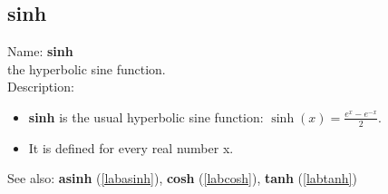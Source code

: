 \subsection{sinh}
\label{labsinh}
\noindent Name: \textbf{sinh}\\
the hyperbolic sine function.\\
\noindent Description: \begin{itemize}

\item \textbf{sinh} is the usual hyperbolic sine function: $\sinh(x) = \frac{e^x - e^{-x}}{2}$.

\item It is defined for every real number x.
\end{itemize}
See also: \textbf{asinh} (\ref{labasinh}), \textbf{cosh} (\ref{labcosh}), \textbf{tanh} (\ref{labtanh})
